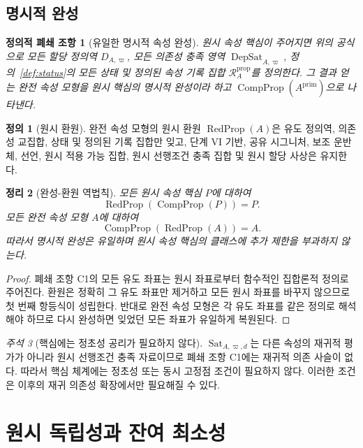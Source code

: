 \documentclass[11pt]{article}
\newcommand{\DepSat}{\operatorname{DepSat}}
\newcommand{\Sat}{\operatorname{Sat}}
\newcommand{\PropRec}{\mathcal R^{\mathrm{prop}}}
\newcommand{\CompProp}{\operatorname{CompProp}}
\newcommand{\RedProp}{\operatorname{RedProp}}
\newtheorem{closureclause}{정의적 폐쇄 조항}
\newtheorem{theorem}{정리}[section]
\theoremstyle{definition}
\newtheorem{definition}[theorem]{정의}
\theoremstyle{remark}
\newtheorem{remark}[theorem]{주석}
\begin{document}
\subsection{명시적 완성}

\begin{closureclause}[유일한 명시적 속성 완성]
\label{cl:completion}
원시 속성 핵심이 주어지면 위의 공식으로 모든 할당 정의역 \(D_{A,\varpi}\), 모든 의존성 충족 영역 \(\DepSat_{A,\varpi}\), 정의~\ref{def:status}의 모든 상태 및 정의된 속성 기록 집합 \(\PropRec_A\)를 정의한다.
그 결과 얻는 완전 속성 모형을 원시 핵심의 \emph{명시적 완성}이라 하고 \(\CompProp(A^{\mathrm{prim}})\)으로 나타낸다.
\end{closureclause}

\begin{definition}[원시 환원]
완전 속성 모형의 원시 환원 \(\RedProp(A)\)은 유도 정의역, 의존성 교집합, 상태 및 정의된 기록 집합만 잊고, 단계 VI 기반, 공유 시그니처, 보조 운반체, 선언, 원시 적용 가능 집합, 원시 선행조건 충족 집합 및 원시 할당 사상은 유지한다.
\end{definition}

\begin{theorem}[완성-환원 역법칙]
\label{thm:completion-inverse}
모든 원시 속성 핵심 \(P\)에 대하여
\[
\RedProp(\CompProp(P))=P.
\]
모든 완전 속성 모형 \(A\)에 대하여
\[
\CompProp(\RedProp(A))=A.
\]
따라서 명시적 완성은 유일하며 원시 속성 핵심의 클래스에 추가 제한을 부과하지 않는다.
\end{theorem}

\begin{proof}
폐쇄 조항 C1의 모든 유도 좌표는 원시 좌표로부터 함수적인 집합론적 정의로 주어진다.
환원은 정확히 그 유도 좌표만 제거하고 모든 원시 좌표를 바꾸지 않으므로 첫 번째 항등식이 성립한다.
반대로 완전 속성 모형은 각 유도 좌표를 같은 정의로 해석해야 하므로 다시 완성하면 잊었던 모든 좌표가 유일하게 복원된다.
\end{proof}

\begin{remark}[핵심에는 정초성 공리가 필요하지 않다]
\(\Sat_{A,\varpi,d}\)는 다른 속성의 재귀적 평가가 아니라 원시 선행조건 충족 자료이므로 폐쇄 조항 C1에는 재귀적 의존 사슬이 없다.
따라서 핵심 체계에는 정초성 또는 동시 고정점 조건이 필요하지 않다.
이러한 조건은 이후의 재귀 의존성 확장에서만 필요해질 수 있다.
\end{remark}

\section{원시 독립성과 잔여 최소성}
\label{sec:independence}
\end{document}

